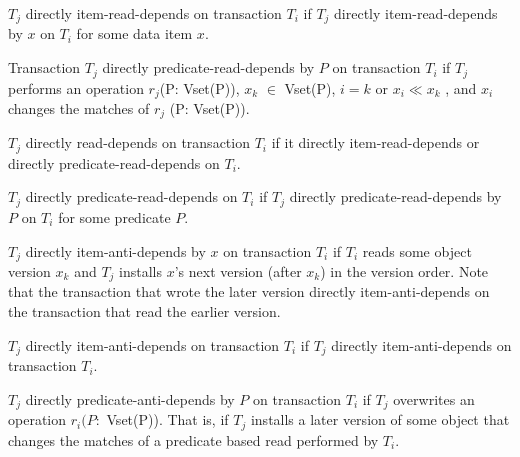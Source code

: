 \begin{definition}
$T_j$ directly item-read-depends on transaction $T_i$ if $T_j$
  directly item-read-depends by $x$ on $T_i$ for some data item $x$.
\end{definition}

\begin{definition}
Transaction $T_j$ directly predicate-read-depends by $P$ on
transaction $T_i$ if $T_j$ performs an operation $r_j$(P: Vset(P)),
$x_k$ $\in$ Vset(P), $i = k$ or $x_i \ll x_k$ , and $x_i$ changes the
matches of $r_j$ (P: Vset(P)).
\end{definition}


\begin{definition}
$T_j$ directly read-depends on transaction $T_i$ if it directly
item-read-depends or directly predicate-read-depends on $T_i$.
\end{definition}

\begin{definition}
$T_j$ directly predicate-read-depends on $T_i$ if $T_j$ directly
  predicate-read-depends by $P$ on $T_i$ for some predicate $P$.
\end{definition}


\begin{definition}
$T_j$ directly item-anti-depends by $x$ on transaction $T_i$ if $T_i$
  reads some object version $x_k$ and $T_j$ installs $x$'s next
  version (after $x_k$) in the version order. Note that the
  transaction that wrote the later version directly item-anti-depends
  on the transaction that read the earlier version.
\end{definition}

\begin{definition}
$T_j$ directly item-anti-depends on transaction $T_i$ if $T_j$
  directly item-anti-depends on transaction $T_i$.
\end{definition}

\begin{definition}
$T_j$ directly predicate-anti-depends by $P$ on transaction $T_i$ if
  $T_j$ overwrites an operation $r_i(P:$ Vset(P)). That is, if $T_j$
  installs a later version of some object that changes the matches of
  a predicate based read performed by $T_i$.
\end{definition}


